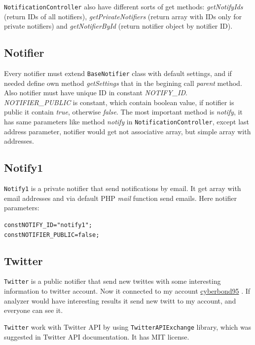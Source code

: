 \texttt{NotificationController} also have different sorts of get methods: \emph{getNotifyIds} (return IDs of all notifiers), \emph{getPrivateNotifiers} (return array with IDs only for private notifiers) and \emph{getNotifierById} (return notifier object by notifier ID).

\subsection{Notifier}

Every notifier must extend \texttt{BaseNotifier} class with default settings, and if needed define own method \emph{getSettings} that in the begining call \emph{parent} method. Also notifier must have unique ID in constant \emph{NOTIFY\_ID}. \emph{NOTIFIER\_PUBLIC} is constant, which contain boolean value, if notifier is public it contain \emph{true}, otherwise \emph{false}. The most important method is \emph{notify}, it has same parameters like method \emph{notify} in \texttt{NotificationController}, except last address parameter, notifier would get not associative array, but simple array with addresses.

\subsection{Notify1}

\texttt{Notify1} is a private notifier that send notifications by email. It get array with email addresses and via default PHP \emph{mail} function send emails. Here notifier parameters:

\begin{alltt}
const NOTIFY_ID = "notify1";
const NOTIFIER_PUBLIC = false;
\end{alltt}

\subsection{Twitter}

\texttt{Twitter} is a public notifier that send new twittes with some interesting information to twitter account. Now it connected to my account \href{https://twitter.com/cyberbond95}{cyberbond95} . If analyzer would have interesting results it send new twitt to my account, and everyone can see it.

\texttt{Twitter} work with Twitter API by using \texttt{TwitterAPIExchange} library, which was suggested in Twitter API documentation. It has MIT license.

